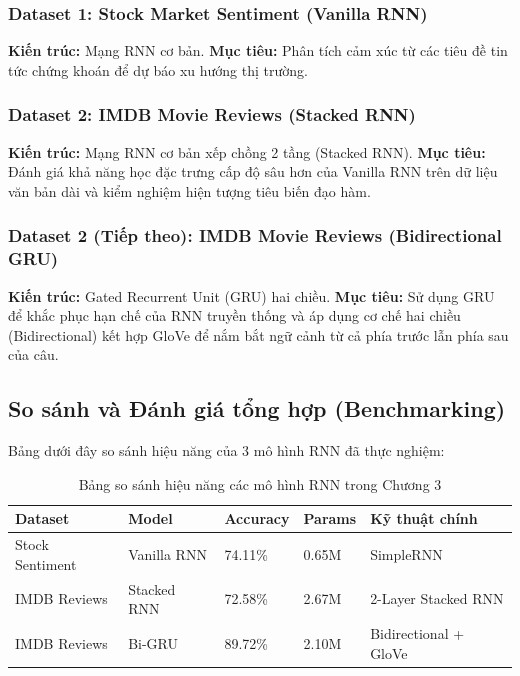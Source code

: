 \subsubsection{Dataset 1: Stock Market Sentiment (Vanilla RNN)}
\textbf{Kiến trúc:} Mạng RNN cơ bản.
\textbf{Mục tiêu:} Phân tích cảm xúc từ các tiêu đề tin tức chứng khoán để dự báo xu hướng thị trường.


\subsubsection{Dataset 2: IMDB Movie Reviews (Stacked RNN)}
\textbf{Kiến trúc:} Mạng RNN cơ bản xếp chồng 2 tầng (Stacked RNN).
\textbf{Mục tiêu:} Đánh giá khả năng học đặc trưng cấp độ sâu hơn của Vanilla RNN trên dữ liệu văn bản dài và kiểm nghiệm hiện tượng tiêu biến đạo hàm.


\subsubsection{Dataset 2 (Tiếp theo): IMDB Movie Reviews (Bidirectional GRU)}
\textbf{Kiến trúc:} Gated Recurrent Unit (GRU) hai chiều.
\textbf{Mục tiêu:} Sử dụng GRU để khắc phục hạn chế của RNN truyền thống và áp dụng cơ chế hai chiều (Bidirectional) kết hợp GloVe để nắm bắt ngữ cảnh từ cả phía trước lẫn phía sau của câu.


\subsection{So sánh và Đánh giá tổng hợp (Benchmarking)}
Bảng dưới đây so sánh hiệu năng của 3 mô hình RNN đã thực nghiệm:

\begin{table}[H]
    \centering
    \begin{tabular}{|l|l|l|l|l|}
    \hline
    \textbf{Dataset} & \textbf{Model} & \textbf{Accuracy} & \textbf{Params} & \textbf{Kỹ thuật chính} \\ \hline
    Stock Sentiment & Vanilla RNN & 74.11\% & 0.65M & SimpleRNN \\ \hline
    IMDB Reviews & Stacked RNN & 72.58\% & 2.67M & 2-Layer Stacked RNN \\ \hline
    IMDB Reviews & Bi-GRU & 89.72\% & 2.10M & Bidirectional + GloVe \\ \hline
    \end{tabular}
    \caption{Bảng so sánh hiệu năng các mô hình RNN trong Chương 3}
    \label{tab:rnn_comparison}
\end{table}

